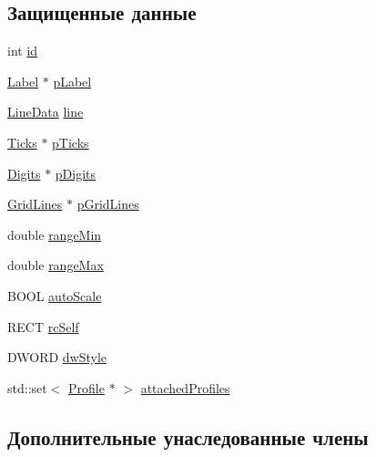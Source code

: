 \subsection*{Защищенные данные}
\begin{DoxyCompactItemize}
\item 
int \hyperlink{class_axis_a12acb583f5bf5f386dc0ea78fa4461aa}{id}
\item 
\hyperlink{class_label}{Label} $\ast$ \hyperlink{class_axis_a28f164cd1a8b77ee7431ade1ee39bc61}{p\-Label}
\item 
\hyperlink{class_line_data}{Line\-Data} \hyperlink{class_axis_a68817bcf5ea38ff2d81698175ae9c6ee}{line}
\item 
\hyperlink{class_ticks}{Ticks} $\ast$ \hyperlink{class_axis_adee9b22eca2aa3d9be3c7a2f9e71039b}{p\-Ticks}
\item 
\hyperlink{class_digits}{Digits} $\ast$ \hyperlink{class_axis_a33bc678ecaf1bda4a3a94c4dab678ac9}{p\-Digits}
\item 
\hyperlink{class_grid_lines}{Grid\-Lines} $\ast$ \hyperlink{class_axis_a56a2fcc5091fd6eca3cd6b80764616bb}{p\-Grid\-Lines}
\item 
double \hyperlink{class_axis_adb0e6da2c0521df03e3e7d820d73af82}{range\-Min}
\item 
double \hyperlink{class_axis_a02853da582831baaa9ebc1289d86ad35}{range\-Max}
\item 
B\-O\-O\-L \hyperlink{class_axis_ae7205720d8bede3b74fab7dd54968d56}{auto\-Scale}
\item 
R\-E\-C\-T \hyperlink{class_axis_a50bf5f208bbca7d528ca52e62b7928e9}{rc\-Self}
\item 
D\-W\-O\-R\-D \hyperlink{class_axis_a9b318f5e15215edb80d3a2bdabc11d44}{dw\-Style}
\item 
std\-::set$<$ \hyperlink{class_profile}{Profile} $\ast$ $>$ \hyperlink{class_axis_a4ce6ac30f1b60e366e6a608b30750d9c}{attached\-Profiles}
\end{DoxyCompactItemize}
\subsection*{Дополнительные унаследованные члены}


